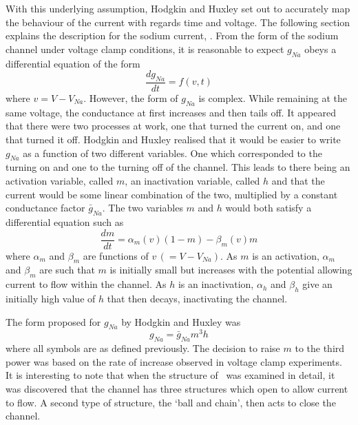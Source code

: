 With this underlying assumption, Hodgkin and Huxley set out to accurately map
the behaviour of the current with regards time and voltage.
The following section explains the description for the sodium current, .
From the form of the sodium channel under voltage clamp conditions, it is
reasonable to expect $g_{Na}$ obeys a differential equation of the form
\begin{equation}
\frac{dg_{Na}}{dt} = f\left(v,t\right)
\label{eqn:intro:math:hh2}
\end{equation}
where $v=V-V_{Na}$.
However, the form of $g_{Na}$ is complex.
While remaining at the same voltage, the conductance at first increases and then
tails off.
It appeared that there were two processes at work, one that turned the current
on, and one that turned it off.
Hodgkin and Huxley realised that it would be easier to write $g_{Na}$ as a
function of two different variables.
One which corresponded to the turning on and one to the turning off of the
channel.
This leads to there being an activation variable, called $m$, an inactivation
variable, called $h$ and that the current would be some linear combination of the
two, multiplied by a constant conductance factor $\bar{g}_{Na}$.
The two variables $m$ and $h$ would both satisfy a differential equation such as
\begin{equation}
\frac{dm}{dt}=\alpha_{m}\left(v\right)\left(1-m\right) -
\beta_{m}\left(v\right)m
\label{eqn:intro:math:dmdt}
\end{equation}
where $\alpha_{m}$ and $\beta_{m}$ are functions of $v\,\left(=V-V_{Na}\right)$.
As $m$ is an activation, $\alpha_{m}$ and $\beta_{m}$ are such that $m$ is
initially small but increases with the potential allowing current to flow within
the channel.
As $h$ is an inactivation, $\alpha_{h}$ and $\beta_{h}$ give an initially high
value of $h$ that then decays, inactivating the channel.

The form proposed for $g_{Na}$ by Hodgkin and Huxley was
\begin{equation}
g_{Na}=\bar{g}_{Na}m^{3}h
\label{eqn:intro:math:gna}
\end{equation}
where all symbols are as defined previously.
The decision to raise $m$ to the third power was based on the rate of increase
observed in voltage clamp experiments.
It is interesting to note that when the structure of \ was examined in
detail, it was discovered that the channel has three structures which open to
allow current to flow.
A second type of structure, the `ball and chain', then acts to close the channel.

